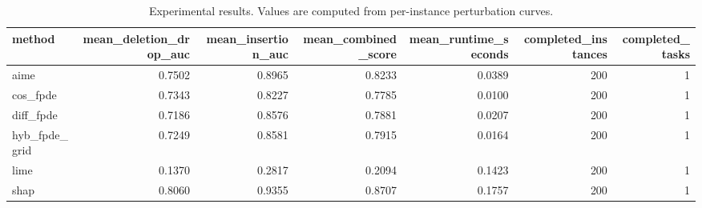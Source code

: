 \begin{table}[t]
\caption{Experimental results. Values are computed from per-instance perturbation curves.}
\label{tab:main_results_computed}
\centering
\begin{tabular}{lrrrrrr}
\toprule
method & mean\_deletion\_drop\_auc & mean\_insertion\_auc & mean\_combined\_score & mean\_runtime\_seconds & completed\_instances & completed\_tasks \\
\midrule
aime & 0.7502 & 0.8965 & 0.8233 & 0.0389 & 200 & 1 \\
cos\_fpde & 0.7343 & 0.8227 & 0.7785 & 0.0100 & 200 & 1 \\
diff\_fpde & 0.7186 & 0.8576 & 0.7881 & 0.0207 & 200 & 1 \\
hyb\_fpde\_grid & 0.7249 & 0.8581 & 0.7915 & 0.0164 & 200 & 1 \\
lime & 0.1370 & 0.2817 & 0.2094 & 0.1423 & 200 & 1 \\
shap & 0.8060 & 0.9355 & 0.8707 & 0.1757 & 200 & 1 \\
\bottomrule
\end{tabular}

\end{table}
